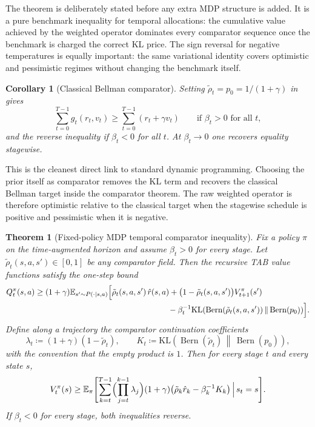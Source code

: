 \documentclass{article}
\newtheorem{theorem}{Theorem}[section]
\newtheorem{corollary}[corollary]{Corollary}
\theoremstyle{remark}
\DeclareMathOperator{\Bern}{Bern}
\newcommand{\E}{\mathbb{E}}
\newcommand{\KL}{\mathrm{KL}}
\newcommand{\defeq}{\coloneqq}
\newcommand{\pprior}{p_0}
\newcommand{\KLbin}[2]{\KL\!\left(\Bern(#1)\,\middle\|\,\Bern(#2)\right)}
\begin{document}
The theorem is deliberately stated before any extra MDP structure is added.
It is a pure benchmark inequality for temporal allocations: the cumulative value achieved by the weighted operator dominates every comparator sequence once the benchmark is charged the correct KL price.
The sign reversal for negative temperatures is equally important: the same variational identity covers optimistic and pessimistic regimes without changing the benchmark itself.


\begin{corollary}[Classical Bellman comparator]
\label{cor:classical-comparator}
Setting $\tilde\rho_t=\pprior=1/(1+\gamma)$ in  gives
\begin{equation}
\sum_{t=0}^{T-1} g_t(r_t,v_t)
\ge
\sum_{t=0}^{T-1}(r_t+\gamma v_t)
\qquad\text{if } \beta_t>0 \text{ for all } t,
\label{eq:classical-comparator-pos}
\end{equation}
and the reverse inequality if $\beta_t<0$ for all $t$.
At $\beta_t\to 0$ one recovers equality stagewise.
\end{corollary}

This is the cleanest direct link to standard dynamic programming.
Choosing the prior itself as comparator removes the KL term and recovers the classical Bellman target inside the comparator theorem.
The raw weighted operator is therefore optimistic relative to the classical target when the stagewise schedule is positive and pessimistic when it is negative.


\begin{theorem}[Fixed-policy MDP temporal comparator inequality]
\label{thm:fixed-policy-comparator}
Fix a policy $\pi$ on the time-augmented horizon and assume $\beta_t>0$ for every stage.
Let $\tilde\rho_t(s,a,s')\in[0,1]$ be any comparator field.
Then the recursive TAB value functions satisfy the one-step bound
\begin{align}
Q_t^\pi(s,a)
\ge
(1+\gamma)
\E_{s'\sim P(\cdot\mid s,a)}
\Bigl[
&\tilde\rho_t(s,a,s')\,\hat r(s,a)
+\bigl(1-\tilde\rho_t(s,a,s')\bigr)V_{t+1}^\pi(s')
\nonumber\\
&\hspace{7em}-\beta_t^{-1}\KLbin{\tilde\rho_t(s,a,s')}{\pprior}
\Bigr].
\label{eq:fixed-policy-comparator-one-step}
\end{align}
Define along a trajectory the comparator continuation coefficients
\[
\lambda_t \defeq (1+\gamma)(1-\tilde\rho_t),
\qquad
K_t \defeq \KLbin{\tilde\rho_t}{\pprior},
\]
with the convention that the empty product is $1$.
Then for every stage $t$ and every state $s$,
\begin{equation}
V_t^\pi(s)
\ge
\E_\pi\Biggl[
\sum_{k=t}^{T-1}
\Bigl(\prod_{j=t}^{k-1}\lambda_j\Bigr)
(1+\gamma)\bigl(\tilde\rho_k\hat r_k - \beta_k^{-1}K_k\bigr)
\,\Big|\, s_t=s
\Biggr].
\label{eq:fixed-policy-comparator-unrolled}
\end{equation}
If $\beta_t<0$ for every stage, both inequalities reverse.
\end{theorem}
\end{document}
